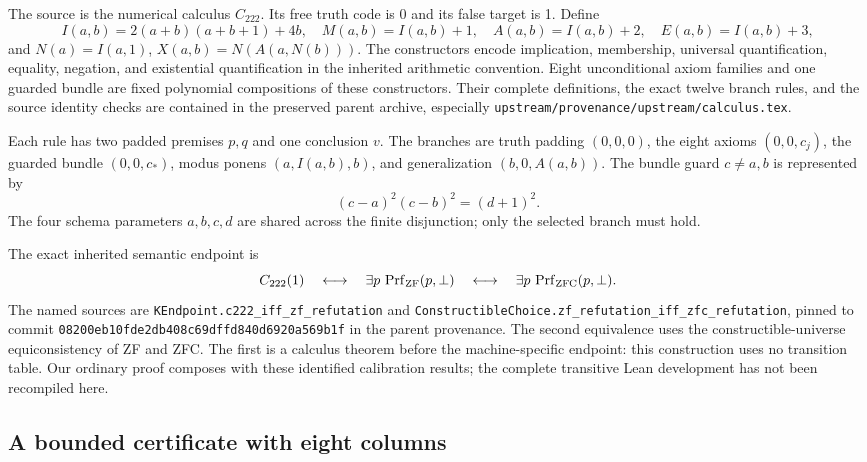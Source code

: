 \documentclass[10pt,letterpaper]{article}
\theoremstyle{remark}\newtheorem{remark}[theorem]{Remark}
\newcommand{\ZFC}{\mathrm{ZFC}}\newcommand{\ZF}{\mathrm{ZF}}
\newcommand{\file}[1]{\texttt{\nolinkurl{#1}}}
\begin{document}
The source is the numerical calculus $C_{222}$. Its free truth code is
0 and its false target is 1. Define
\[
 I(a,b)=2(a+b)(a+b+1)+4b,\quad
 M(a,b)=I(a,b)+1,\quad A(a,b)=I(a,b)+2,\quad E(a,b)=I(a,b)+3,
\]
and $N(a)=I(a,1)$, $X(a,b)=N(A(a,N(b)))$.
The constructors encode implication, membership, universal
quantification, equality, negation, and existential quantification in
the inherited arithmetic convention. Eight unconditional axiom families
and one guarded bundle are fixed polynomial compositions of these
constructors. Their complete definitions, the exact twelve branch rules,
and the source identity checks are contained in the preserved parent
archive, especially \file{upstream/provenance/upstream/calculus.tex}.

Each rule has two padded premises $p,q$ and one conclusion $v$. The
branches are truth padding $(0,0,0)$, the eight axioms $(0,0,c_j)$, the
guarded bundle $(0,0,c_*)$, modus ponens
$(a,I(a,b),b)$, and generalization $(b,0,A(a,b))$.
The bundle guard $c\ne a,b$ is represented by
\[
 (c-a)^2(c-b)^2=(d+1)^2.
\]
The four schema parameters $a,b,c,d$ are shared across the finite
disjunction; only the selected branch must hold.

The exact inherited semantic endpoint is
\begin{equation}\label{eq:calibration}
 C_{222}(1)\quad\longleftrightarrow\quad
 \exists p\,\Prf_{\ZF}(p,\bot)
 \quad\longleftrightarrow\quad
 \exists p\,\Prf_{\ZFC}(p,\bot).
\end{equation}
The named sources are \file{KEndpoint.c222_iff_zf_refutation} and
\file{ConstructibleChoice.zf_refutation_iff_zfc_refutation}, pinned to
commit \file{08200eb10fde2db408c69dffd840d6920a569b1f} in the parent
provenance. The second equivalence uses the constructible-universe
equiconsistency of ZF and ZFC. The first is a calculus theorem before
the machine-specific endpoint: this construction uses no transition table.
Our ordinary proof composes with these identified calibration results;
the complete transitive Lean development has not been recompiled here.

\subsection{A bounded certificate with eight columns}
\end{document}
